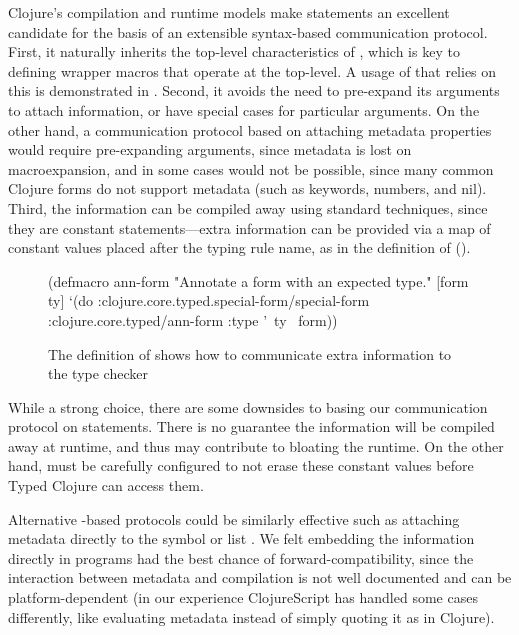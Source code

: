 Clojure's compilation and runtime models make  statements an excellent candidate for the basis of
an extensible syntax-based communication protocol.
First, it naturally inherits the top-level characteristics of , which is key to defining
wrapper macros that operate at the top-level.
A usage of  that relies on this is demonstrated in .
Second, it avoids the need to pre-expand its arguments to attach information, or
have special cases for particular arguments.
On the other hand, a communication protocol based on attaching metadata properties
would require pre-expanding arguments, since metadata is lost on macroexpansion,
and in some cases would not be possible, since many common Clojure forms do not support metadata
(such as keywords, numbers, and nil).
Third, the information can be compiled away using standard techniques,
since they are constant statements---extra information can be provided via a map of constant values
placed after the typing rule name, as in
the definition of  ().

\begin{figure*}
\begin{cljlisting}
(defmacro ann-form
  "Annotate a form with an expected type."
  [form ty]
  `(do :clojure.core.typed.special-form/special-form
       :clojure.core.typed/ann-form
       {:type '~ty}
       ~form))
\end{cljlisting}
  \caption{The definition of  shows how to communicate extra information to the type checker}
  \label{fig:analyzer:ann-form-definition}
\end{figure*}

While a strong choice, there are some downsides to basing our communication protocol on 
statements.
There is no guarantee the information will be compiled away at runtime, and
thus may contribute to bloating the runtime.
On the other hand,  must be carefully configured to not erase these constant
values before Typed Clojure can access them.

Alternative -based protocols could be similarly effective
such as attaching metadata directly to the symbol  or list .
We felt embedding the information directly in programs had the best chance of forward-compatibility,
since the interaction between metadata and compilation is not well documented and
can be platform-dependent (in our experience ClojureScript has handled some cases differently,
like evaluating metadata instead of simply quoting it as in Clojure).

